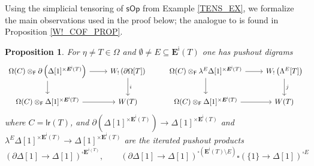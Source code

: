 \documentclass[a4paper,10pt
,draft
]{article}%
\numberwithin{equation}{section}
\numberwithin{figure}{section}
\newtheorem{proposition}[equation]{Proposition}%
\theoremstyle{definition} %
\newcommand{\sOp}{\ensuremath{\mathsf{sOp}}}%
\newcommand{\1}{\ensuremath{\mathbbm 1}}%
\begin{document}
Using the simplicial tensoring of $\sOp$ from Example \ref{TENS_EX},
we formalize the main observations used in the proof \cite[Prop. 4.5]{CM13b} below;
the analogue to \cite[Prop. 4.8]{CM13b} is found in Proposition \ref{W!_COF_PROP}.
\begin{proposition}
      \label{WLEFTQPUSH PROP}
      For $\eta \neq T \in \Omega$
      and $\emptyset \neq E \subseteq \boldsymbol{E}^{\mathsf{i}}(T)$
      one has pushout digrams
      \begin{equation}
            \label{WLEFTQPUSH_EQ}
            \begin{tikzcd}
                  \Omega(C) \otimes_{\mathsf{F}}
                  \partial \left(\Delta[1]^{\times \boldsymbol{E}^{\mathsf{i}}(T)}\right)
                  \ar{r} \ar{d}
                  &
                  W_! \left(\partial \Omega[T]\right) 
                  \arrow[d, "i"]
                  & %
                  \Omega(C) \otimes_{\mathsf{F}}
                  \lambda^E \Delta[1]^{\times \boldsymbol{E}^{\mathsf{i}}(T)}
                  \ar{r} \ar{d}
                  &
                  W_! \left(\Lambda^E[T]\right) 
                  \arrow[d, "j"]
                  \\
                  \Omega(C) \otimes_{\mathsf{F}}
                  \Delta[1]^{\times \boldsymbol{E}^{\mathsf{i}}(T)}
                  \ar{r}
                  &
                  W(T)
                  & %
                  \Omega(C) \otimes_{\mathsf{F}}
                  \Delta[1]^{\times \boldsymbol{E}^{\mathsf{i}}(T)}
                  \ar{r}
                  &
                  W(T)
            \end{tikzcd}
      \end{equation}
      where
      $C = \mathsf{lr}(T)$, and
      $\partial \left(\Delta[1]^{\times \boldsymbol{E}^{\mathsf{i}}(T)}\right)
      \to
      \Delta[1]^{\times \boldsymbol{E}^{\mathsf{i}}(T)}$
      and
      $\lambda^E \Delta[1]^{\times \boldsymbol{E}^{\mathsf{i}}(T)}
      \to \Delta[1]^{\times \boldsymbol{E}^{\mathsf{i}}(T)}$
      are the iterated pushout products
      \[
            \left(
                  \partial\Delta[1] \to \Delta[1]
            \right)^{\square \boldsymbol E^{i(T)}},
            \qquad
            \left(
                  \partial \Delta[1] \to \Delta[1]
            \right)^{\square (\boldsymbol{E}^{\mathsf{i}}(T) \setminus E)}
            \square
            \left(
                  \{1\} \to \Delta[1]
            \right)^{\square E}
      \]
\end{proposition}
\end{document}
